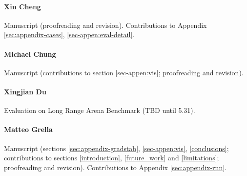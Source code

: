 \documentclass[11pt]{article}
\begin{document}
\paragraph{Xin Cheng} Manuscript (proofreading and revision). Contributions to Appendix \ref{sec:appendix-cases}, \ref{sec-appen:eval-detail}.

\paragraph{Michael Chung} Manuscript (contributions to section \ref{sec-appen:vis}; proofreading and revision).

\paragraph{Xingjian Du} Evaluation on Long Range Arena Benchmark (TBD until 5.31).

\paragraph{Matteo Grella} Manuscript (sections \ref{sec:appendix-gradstab},  \ref{sec-appen:vis}, \ref{conclusions}; contributions to sections \ref{introduction}, \ref{future_work} and \ref{limitations}; proofreading and revision). Contributions to Appendix \ref{sec:appendix-rnn}.
\end{document}
